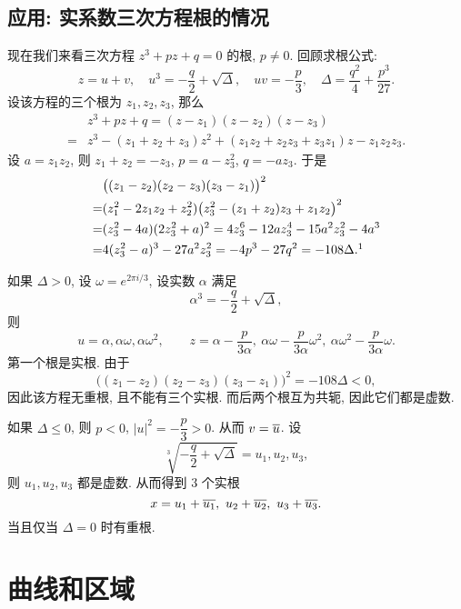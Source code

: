 \subsection{应用: 实系数三次方程根的情况\optional}
现在我们来看三次方程 $z^3+pz+q=0$ 的根, $p\neq 0$.
回顾求根公式:
  \[z=u+v,\quad u^3=-\frac q2+\sqrt{\Delta},\quad uv=-\frac p3,\quad \Delta=\frac{q^2}4+\frac{p^3}{27}.\]
设该方程的三个根为 $z_1,z_2,z_3$, 那么
\begin{align*}
   &z^3+pz+q=(z-z_1)(z-z_2)(z-z_3)\\
  =&z^3-(z_1+z_2+z_3)z^2+(z_1z_2+z_2z_3+z_3z_1)z-z_1z_2z_3.
\end{align*}
设 $a=z_1z_2$, 则 $z_1+z_2=-z_3$, $p=a-z_3^2$, $q=-az_3$.
于是
\begin{align*}
   &\bigl((z_1-z_2)(z_2-z_3)(z_3-z_1)\bigr)^2\\
  =&(z_1^2-2z_1z_2+z_2^2)\bigl(z_3^2-(z_1+z_2)z_3+z_1z_2\bigr)^2\\
  =&(z_3^2-4a)(2z_3^2+a)^2=4z_3^6-12az_3^4-15a^2z_3^2-4a^3\\
  =&4(z_3^2-a)^3-27a^2z_3^2=-4p^3-27q^2=-108\Delta.\footnotemark
\end{align*}
\begin{enumpar}
  \item 如果 $\Delta>0$, 设 $\omega=e^{2\pi i/3}$, 设实数 $\alpha$ 满足
    \[\alpha^3=-\frac q2+\sqrt{\Delta},\]
  则
    \[
      u=\alpha,\alpha\omega,\alpha\omega^2,\qquad
      z=\alpha-\frac p{3\alpha},\ 
        \alpha\omega-\frac p{3\alpha} \omega^2,\ 
        \alpha\omega^2-\frac p{3\alpha} \omega.
    \]
    第一个根是实根.
    由于
    \[\bigl((z_1-z_2)(z_2-z_3)(z_3-z_1)\bigr)^2=-108\Delta<0,\]
    因此该方程无重根, 且不能有三个实根.
    而后两个根互为共轭, 因此它们都是虚数.
  \item 如果 $\Delta\le 0$, 则 $p<0$, $|u|^2=-\dfrac p3>0$. 从而 $v=\overline u$.
    设
      \[\sqrt[3]{-\frac q2+\sqrt{\Delta}}=u_1,u_2,u_3,\]
    则 $u_1,u_2,u_3$ 都是虚数. 从而得到 $3$ 个实根
      \[x=u_1+\ov{u_1},\ u_2+\ov{u_2},\ u_3+\ov{u_3}.\]
    当且仅当 $\Delta=0$ 时有重根.
\end{enumpar}


\section{曲线和区域}

